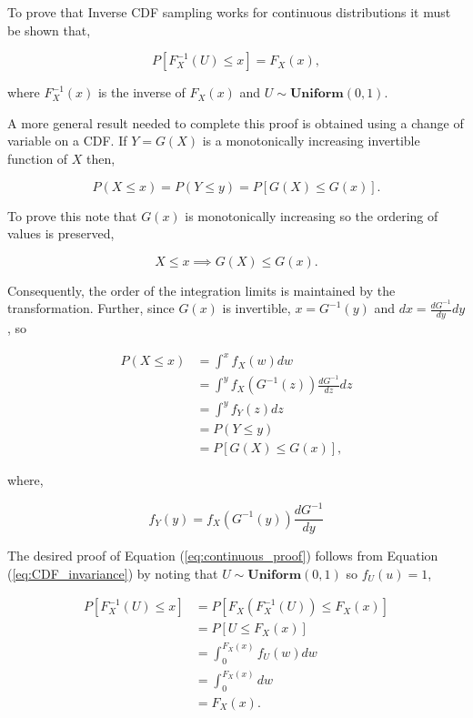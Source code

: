 \documentclass[12pt]{article}
\begin{document}
To prove that Inverse CDF sampling works for continuous distributions it must be shown that,

\begin{equation}
\label{eq:continuous_proof}
P[F_X^{-1}(U) \leq x] = F_X(x),
\end{equation}

where $F_X^{-1}(x)$ is the inverse of $F_X(x)$ and $U \sim \textbf{Uniform}(0, 1)$.

A more general result needed to complete
this proof is obtained using a change of variable on a CDF. If $Y=G(X)$ is a monotonically increasing invertible function
of $X$ then,

\begin{equation}
\label{eq:CDF_invariance}
P(X \leq x) = P(Y \leq y) = P[G(X) \leq G(x)].
\end{equation}

To prove this note that $G(x)$ is monotonically increasing so the ordering of values is preserved,

$$ X \le x \implies G(X) \le G(x).$$

Consequently, the order of the integration limits is maintained by the transformation. Further, since $G(x)$ is invertible,
$x = G^{-1}(y)$ and $dx = \frac{dG^{-1}}{dy} dy$, so

$$
\begin{aligned}
P(X \leq x) & = \int^{x} f_X(w) dw \\
& = \int^{y} f_X(G^{-1}(z)) \frac{dG^{-1}}{dz} dz \\
& = \int^{y} f_Y(z) dz \\
& = P(Y \leq y) \\
& = P[G(X) \leq G(x)],
\end{aligned}
$$

where,

$$ f_Y(y) = f_X(G^{-1}(y)) \frac{dG^{-1}}{dy} $$

The desired proof of Equation (\ref{eq:continuous_proof}) follows from Equation (\ref{eq:CDF_invariance}) by noting that
$U \sim \textbf{Uniform}(0, 1)$ so $f_U(u) = 1$,

$$
\begin{aligned}
P[F_X^{-1}(U) \leq x] & = P[F_X(F_X^{-1}(U)) \leq F_X(x)] \\
& = P[U \leq F_X(x)] \\
& = \int_{0}^{F_X(x)} f_U(w) dw \\
& = \int_{0}^{F_X(x)} dw \\
& = F_X(x).
\end{aligned}
$$
\end{document}
